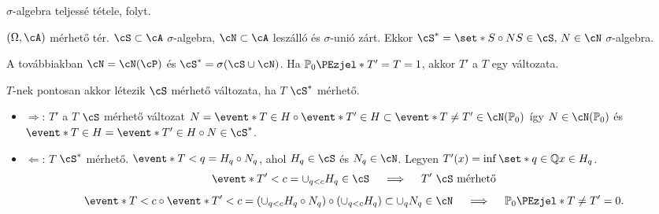 \documentclass[aspectratio=169,notheorems,9pt,\option]{beamer}
\begin{document}
\begin{frame}{$\sigma$-algebra teljessé tétele, folyt.}
  \begin{proposition}
    $(\Omega,\cA)$ mérhető tér. $\cS\subset\cA$ $\sigma$-algebra, 
    $\cN\subset\cA$ leszálló és $\sigma$-unió zárt. Ekkor
    $\cS^*=\set*{S\circ N}{S\in\cS,\,N\in\cN}$ $\sigma$-algebra.
  \end{proposition}
  
  A továbbiakban $\cN=\cN(\cP)$ és $\cS^*=\sigma(\cS\cup\cN)$.
  Ha $\P[0]{T'=T}=1$, akkor %
  $T'$ a $T$ egy változata.
  \begin{proposition}
    $T$-nek pontosan akkor létezik $\cS$ mérhető változata, ha $T$ $\cS^*$ mérhető.
  \end{proposition}
  \begin{itemize}
    \item $\Rightarrow$: $T'$  a $T$ $\cS$ mérhető változat 
    $N=\event*{T\in H}\circ\event*{T'\in H}\subset \event*{T\neq T'}\in\cN(\P[0])$ 
    így $N\in\cN(\P[0])$ 
    és $\event*{T\in H}=\event*{T'\in H}\circ N\in \cS^*$. 
    \item $\Leftarrow$: $T$ $\cS^*$ mérhető. $\event*{T<q}=H_q\circ N_q$, 
    ahol $H_q\in\cS$ és $N_q\in\cN$.
    \pause
    Legyen $T'(x)=\inf\set*{q\in\Q}{x\in H_q}$.
    \pause
    \begin{displaymath}
      \event*{T'<c}=\cup_{q<c} H_q\in\cS\quad\implies\quad \text{$T'$ $\cS$ mérhető}
    \end{displaymath} 
    \pause
    \begin{displaymath}
      \event*{T<c}\circ\event*{T'<c}=(\cup_{q<c}H_q\circ N_q)\circ(\cup_{q<c}H_q)
      \subset\cup_q N_q\in\cN \quad\implies\quad\P[0]{T\neq T'}=0.
    \end{displaymath}
  \end{itemize}  
\end{frame}

  
\end{document}
